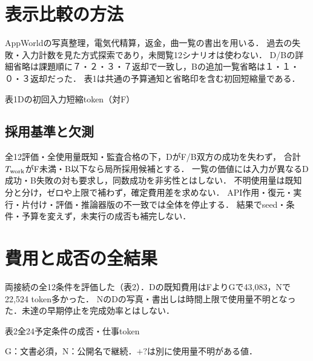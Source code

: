 \documentclass[uplatex,a4paper,twocolumn,10pt]{jsarticle}
\begin{document}
\section{表示比較の方法}



AppWorld\cite{appworld}の写真整理，電気代精算，返金，曲一覧の書出を用いる．
過去の失敗・入力計数を見た方式探索であり，未閲覧12シナリオは使わない．
D/Bの詳細省略は課題順に７・２・３・７返却で一致し，Bの追加一覧省略は１・１・０・３返却だった．
表1は共通の予算通知と省略印を含む初回短縮量である．

\begin{center}\begin{minipage}{\columnwidth}\centering
\small 表1\quad Dの初回入力短縮token（対F）\par\smallskip
\PublicDisplayInitialSavings
\end{minipage}\end{center}

\subsection{採用基準と欠測}
全12評価・全使用量既知・監査合格の下，DがF/B双方の成功を失わず，
合計$T_{\rm work}$がF未満・B以下なら局所採用候補とする．
一覧の価値には入力が異なるD成功・B失敗の対も要求し，同数成功を非劣性とはしない．
不明使用量は既知分と分け，ゼロや上限で補わず，確定費用差を求めない．
API作用・復元・実行・片付け・評価・推論器版の不一致では全体を停止する．
結果でseed・条件・予算を変えず，未実行の成否も補完しない．

\section{費用と成否の全結果}
両接続の全12条件を評価した（表2）．Dの既知費用はFよりGで43,083，Nで22,524 token多かった．
NのDの写真・書出しは時間上限で使用量不明となった．未達の早期停止を完成効率とはしない．

\begin{center}\begin{minipage}{\columnwidth}\centering
\small 表2\quad 全24予定条件の成否・仕事token\par\smallskip
\PublicDisplayAllCells
\par\smallskip\footnotesize G：文書必須，N：公開名で継続．$+?$は別に使用量不明がある値．
\end{minipage}\end{center}
\end{document}
